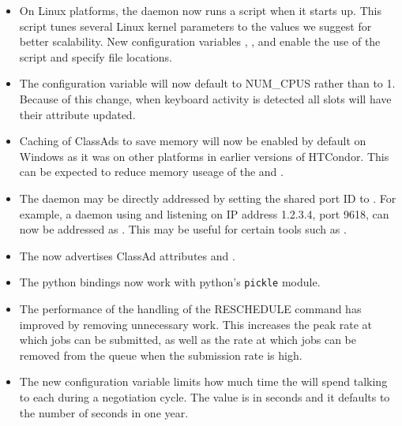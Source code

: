 \begin{itemize}

\item On Linux platforms, the  daemon now runs a script when it
starts up.
This script tunes several Linux kernel parameters to the values
we suggest for better scalability.  
New configuration variables ,
, and 
enable the use of the script and specify file locations.

\item The configuration variable  will now
default to NUM\_CPUS rather than to 1.  Because of this change, when keyboard
activity is detected all slots will have their 
attribute updated.

\item Caching of ClassAds to save memory will now be enabled by default on
Windows as it was on other platforms in earlier versions of HTCondor.  This
can be expected to reduce memory useage of the  and .

\item The  daemon may be directly addressed by setting
the shared port ID to .
For example, a daemon using  and listening
on IP address 1.2.3.4, port 9618,
can now be addressed as .
This may be useful for certain tools such as .

\item The  now advertises ClassAd attributes
 and .

\item The python bindings now work with python's \texttt{pickle} module.

\item The performance of the  handling of the RESCHEDULE
command has improved by removing unnecessary work.
This increases the peak rate at which jobs can be submitted,
as well as the rate at which jobs can be removed from the queue
when the submission rate is high.

\item The new configuration variable
 limits how much time the
 will spend talking to each  during a
negotiation cycle.
The value is in seconds and it defaults to the number of seconds in one year.


\end{itemize}

